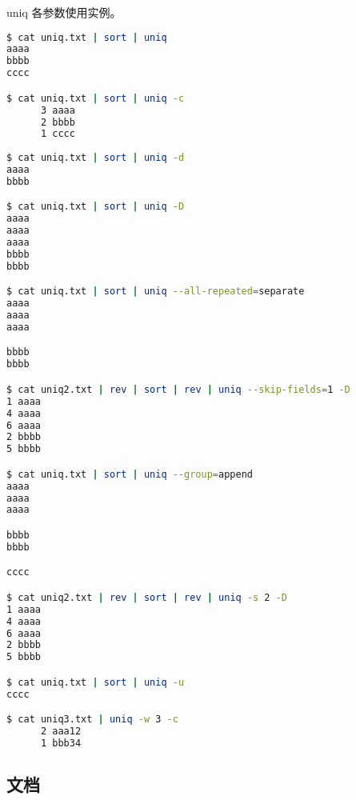 uniq 各参数使用实例。
\begin{lstlisting}[language=bash, numbersep=1em, numberstyle=\footnotesize , breaklines=true]
$ cat uniq.txt | sort | uniq
aaaa
bbbb
cccc

$ cat uniq.txt | sort | uniq -c
      3 aaaa
      2 bbbb
      1 cccc
      
$ cat uniq.txt | sort | uniq -d
aaaa
bbbb

$ cat uniq.txt | sort | uniq -D
aaaa
aaaa
aaaa
bbbb
bbbb

$ cat uniq.txt | sort | uniq --all-repeated=separate
aaaa
aaaa
aaaa

bbbb
bbbb

$ cat uniq2.txt | rev | sort | rev | uniq --skip-fields=1 -D
1 aaaa
4 aaaa
6 aaaa
2 bbbb
5 bbbb

$ cat uniq.txt | sort | uniq --group=append
aaaa
aaaa
aaaa

bbbb
bbbb

cccc

$ cat uniq2.txt | rev | sort | rev | uniq -s 2 -D
1 aaaa
4 aaaa
6 aaaa
2 bbbb
5 bbbb

$ cat uniq.txt | sort | uniq -u
cccc

$ cat uniq3.txt | uniq -w 3 -c
      2 aaa12
      1 bbb34
\end{lstlisting}

\subsection{文档}
